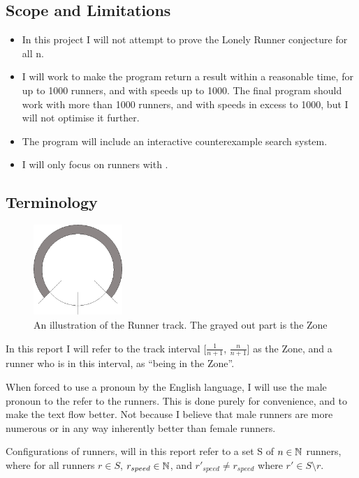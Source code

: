 \subsection{Scope and Limitations}
\label{scope}
\begin{itemize}
\item In this project I will not attempt to prove the Lonely Runner conjecture for all n. 
\item I will work to make the program return a result within a reasonable time, for up to 1000 runners, and with speeds up to 1000. The final program should work with more than 1000 runners, and with speeds in excess to 1000, but I will not optimise it further. \item The program will include an interactive counterexample search system.
\item I will only focus on runners with .
\end{itemize}

\subsection{Terminology}
\label{Termonolgy}
\begin{figure}[H]
  \centering
  \includegraphics[width=0.3\textwidth]{./images/circleZonePng.png}
  \caption{\label{circleZoneImg}An illustration of the Runner track. The grayed out part is the Zone}
\end{figure}

In this report I will refer to the track interval [$\frac{1}{n + 1}$, $\frac{n}{n+1}$] as the Zone, and a runner who is in this interval, as ``being in the Zone''.

When forced to use a pronoun by the English language, I will use the male pronoun to the refer to the runners. This is done purely for convenience, and to make the text flow better. Not because I believe that male runners are more numerous or in any way inherently better than female runners.

Configurations of runners, will in this report refer to a set S of $n \in \mathbb{N}$ runners, where for all runners $r \in S$, $r_{speed} \in \mathbb{N}$, and $r\prime_{speed} \neq r_{speed}$ where $r\prime \in S \setminus r$.

